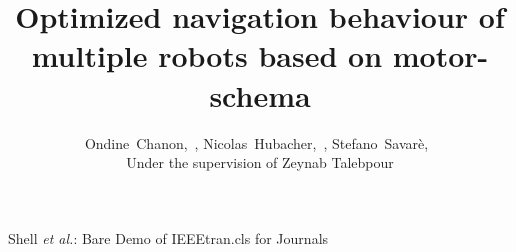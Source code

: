 \documentclass[journal]{IEEEtran}
\begin{document}
%
\title{Optimized navigation behaviour of multiple robots based on motor-schema}
%
%
%

\author{Ondine~Chanon,~,
        Nicolas~Hubacher,~,
        Stefano~Savar\`e,~ \\
        Under the supervision of Zeynab Talebpour}%

% 
%



%
{Shell \MakeLowercase{\textit{et al.}}: Bare Demo of IEEEtran.cls for Journals}
% 
\end{document}

